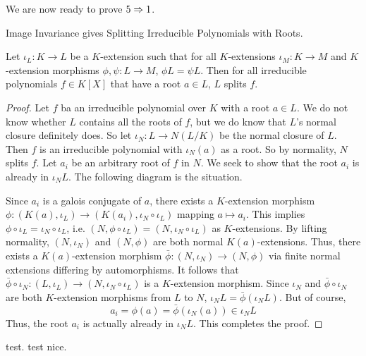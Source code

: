 \documentclass[../book.tex]{subfiles}
\begin{document}
We are now ready to prove $5 \Rightarrow 1$. 
\begin{thm} Image Invariance gives Splitting Irreducible Polynomials with Roots.
    
    Let $\iota_L : K \to L$ be a $K$-extension such that
    for all $K$-extensions $\iota_M : K \to M$ and 
    $K$-extension morphisms $\phi, \psi : L \to M$, $\phi L = \psi L$. 
    Then for all irreducible polynomials $f \in K[X]$ that have a root $a \in L$, 
    $L$ splits $f$. 
\end{thm}
\begin{proof}
    Let $f$ ba an irreducible polynomial over $K$ with a root $a \in L$. 
    We do not know whether $L$ contains all the roots of $f$, 
    but we do know that $L$'s normal closure definitely does. 
    So let $\iota_N : L \to N(L/K)$ be the normal closure of $L$. 
    Then $f$ is an irreducible polynomial with $\iota_N(a)$ as a root.
    So by normality, $N$ splits $f$. 
    Let $a_i$ be an arbitrary root of $f$ in $N$. 
    We seek to show that the root $a_i$ is already in $\iota_N L$. 
    The following diagram is the situation. 
    \begin{figure} [H]
        \centering
    \end{figure}
    Since $a_i$ is a galois conjugate of $a$, 
    there exists a $K$-extension morphism 
    $\phi : (K(a),\iota_L) \to (K(a_i),\iota_N\circ\iota_L)$ mapping $a \mapsto a_i$. 
    This implies $\phi\circ\iota_L = \iota_N\circ\iota_L$, i.e.
    $(N,\phi\circ\iota_L) = (N,\iota_N\circ\iota_L)$ as $K$-extensions.
    By lifting normality, $(N,\iota_N)$ and $(N,\phi)$ are both normal $K(a)$-extensions.
    Thus, there exists a $K(a)$-extension morphism $\bar\phi : (N,\iota_N) \to (N,\phi)$
    via finite normal extensions differing by automorphisms. 
    It follows that $\bar\phi\circ\iota_N : (L,\iota_L) \to (N,\iota_N\circ\iota_L)$
    is a $K$-extension morphism. 
    Since $\iota_N$ and $\bar\phi\circ\iota_N$ are 
    both $K$-extension morphisms from $L$ to $N$,
    $\iota_N L = \bar\phi(\iota_N L)$.
    But of course, 
    \[ a_i = \phi(a) = \bar\phi(\iota_N(a)) \in \iota_N L\]
    Thus, the root $a_i$ is actually already in $\iota_N L$.
    This completes the proof. 
\end{proof}

test. test nice. 
\end{document}
